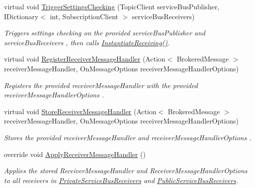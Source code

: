 \begin{DoxyCompactItemize}
virtual void \hyperlink{classCqrs_1_1Azure_1_1ServiceBus_1_1AzureServiceBus_a31ea4f3f8f5acea0225909611097297e_a31ea4f3f8f5acea0225909611097297e}{Trigger\+Settings\+Checking} (Topic\+Client service\+Bus\+Publisher, I\+Dictionary$<$ int, Subscription\+Client $>$ service\+Bus\+Receivers)
\begin{DoxyCompactList}\small\item\em Triggers settings checking on the provided {\itshape service\+Bus\+Publisher}  and {\itshape service\+Bus\+Receivers} , then calls \hyperlink{classCqrs_1_1Azure_1_1ServiceBus_1_1AzureServiceBus_ad49a2d063279ec98443e7f1d69178cfa_ad49a2d063279ec98443e7f1d69178cfa}{Instantiate\+Receiving()}. \end{DoxyCompactList}\item 
virtual void \hyperlink{classCqrs_1_1Azure_1_1ServiceBus_1_1AzureServiceBus_ad19764cc41efba37d6a8d96f8a58f906_ad19764cc41efba37d6a8d96f8a58f906}{Register\+Receiver\+Message\+Handler} (Action$<$ Brokered\+Message $>$ receiver\+Message\+Handler, On\+Message\+Options receiver\+Message\+Handler\+Options)
\begin{DoxyCompactList}\small\item\em Registers the provided {\itshape receiver\+Message\+Handler}  with the provided {\itshape receiver\+Message\+Handler\+Options} . \end{DoxyCompactList}\item 
virtual void \hyperlink{classCqrs_1_1Azure_1_1ServiceBus_1_1AzureServiceBus_adae5c09b9b3123bd998e99b5b76e21e2_adae5c09b9b3123bd998e99b5b76e21e2}{Store\+Receiver\+Message\+Handler} (Action$<$ Brokered\+Message $>$ receiver\+Message\+Handler, On\+Message\+Options receiver\+Message\+Handler\+Options)
\begin{DoxyCompactList}\small\item\em Stores the provided {\itshape receiver\+Message\+Handler}  and {\itshape receiver\+Message\+Handler\+Options} . \end{DoxyCompactList}\item 
override void \hyperlink{classCqrs_1_1Azure_1_1ServiceBus_1_1AzureServiceBus_a6ea94560e02fce0d920c467062f5fc98_a6ea94560e02fce0d920c467062f5fc98}{Apply\+Receiver\+Message\+Handler} ()
\begin{DoxyCompactList}\small\item\em Applies the stored Receiver\+Message\+Handler and Receiver\+Message\+Handler\+Options to all receivers in \hyperlink{classCqrs_1_1Azure_1_1ServiceBus_1_1AzureServiceBus_ac52e1a7e17f4ffb80f95d31424101aaa_ac52e1a7e17f4ffb80f95d31424101aaa}{Private\+Service\+Bus\+Receivers} and \hyperlink{classCqrs_1_1Azure_1_1ServiceBus_1_1AzureServiceBus_ac73f294e6a99655f2ff7e391646f2e5d_ac73f294e6a99655f2ff7e391646f2e5d}{Public\+Service\+Bus\+Receivers}. \end{DoxyCompactList}\item 

\end{DoxyCompactItemize}
